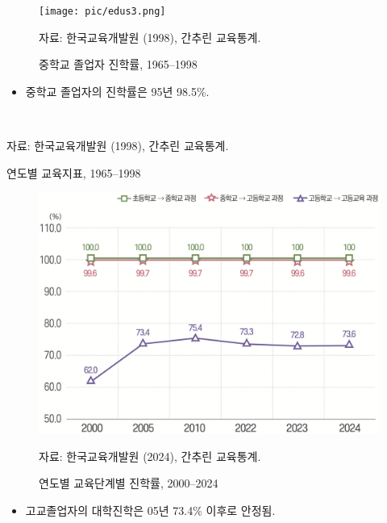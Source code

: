 \documentclass[aspectratio=169,xcolor=dvipsnames,handout]{beamer}
\begin{document}
\begin{frame}[<+->]
    \begin{figure}
        \centering
        \texttt{[image: pic/edus3.png]}
        \\
        \raggedright%
        \hspace{1.5em}
        \tiny{자료: 한국교육개발원 (1998), 간추린 교육통계.}
        \caption{중학교 졸업자 진학률, 1965--1998}
    \end{figure}
    \begin{itemize}
        \item 중학교 졸업자의 진학률은 95년 98.5\%.
    \end{itemize}
\end{frame}

\begin{frame}[<+->]
    \begin{table}
        \centering
        \resizebox{.7\textwidth}{!}{\relax
            
        }
        \\
        \raggedright%
        \hspace{1.5em}
        \tiny{자료: 한국교육개발원 (1998), 간추린 교육통계.}
        \caption{연도별 교육지표, 1965--1998}
    \end{table}
\end{frame}

\begin{frame}[<+->]
    \begin{figure}
        \centering
        \includegraphics[width=.4\textwidth]{pic/edus4.png}
        \\
        \raggedright%
        \hspace{1.5em}
        \tiny{자료: 한국교육개발원 (2024), 간추린 교육통계.}
        \caption{연도별 교육단계별 진학률, 2000--2024}
    \end{figure}
    \begin{itemize}
        \item 고교졸업자의 대학진학은 05년 73.4\% 이후로 안정됨.
    \end{itemize}
\end{frame}
\end{document}
